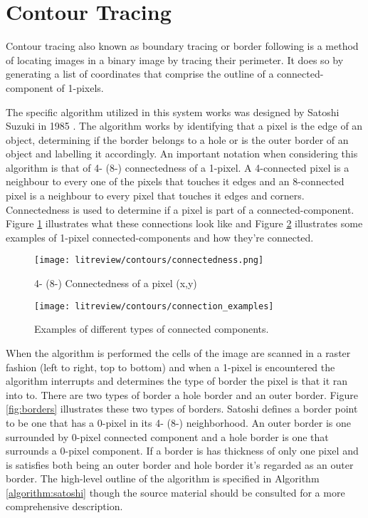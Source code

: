 \section{Contour Tracing}

Contour tracing also known as boundary tracing or border following is a method of locating images in a binary image by tracing their perimeter. It does so by generating a list of coordinates that comprise the outline of a connected-component of 1-pixels. 

The specific algorithm utilized in this system works was designed by Satoshi Suzuki in 1985 \cite{satoshi_findContours}. The algorithm works by identifying that a pixel is the edge of an object, determining if the border belongs to a hole or is the outer border of an object and labelling it accordingly. An important notation when considering this algorithm is that of 4- (8-) connectedness of a 1-pixel. A 4-connected pixel is a neighbour to every one of the pixels that touches it edges and an 8-connected pixel is a neighbour to every pixel that touches it edges and corners. Connectedness is used to determine if a pixel is part of a connected-component. Figure \ref{fig:connectedness} illustrates what these connections look like and Figure \ref{fig:connection_examples} illustrates some examples of 1-pixel connected-components and how they're connected.

\begin{figure}[H]
    \centering
    \centering\texttt{[image: litreview/contours/connectedness.png]}
    \caption{4- (8-) Connectedness of a pixel (x,y)}
    \label{fig:connectedness}
  \end{figure}

  \begin{figure}[H]
    \centering
    \centering\texttt{[image: litreview/contours/connection\_examples]}
    \caption{Examples of different types of connected components.}
    \label{fig:connection_examples}
  \end{figure}
  

When the algorithm is performed the cells of the image are scanned in a raster fashion (left to right, top to bottom) and when a 1-pixel is encountered the algorithm interrupts and determines the type of border the pixel is that it ran into to. There are two types of border a hole border and an outer border. Figure \ref{fig:borders} illustrates these two types of borders. Satoshi defines a border point to be one that has a 0-pixel in its 4- (8-) neighborhood. An outer border is one surrounded by 0-pixel connected component and a hole border is one that surrounds a 0-pixel component. If a border is has thickness of only one pixel and is satisfies both being an outer border and hole border it's regarded as an outer border. The high-level outline of the algorithm is specified in Algorithm \ref{algorithm:satoshi} though the source material \cite{satoshi_findContours} should be consulted for a more comprehensive description.

